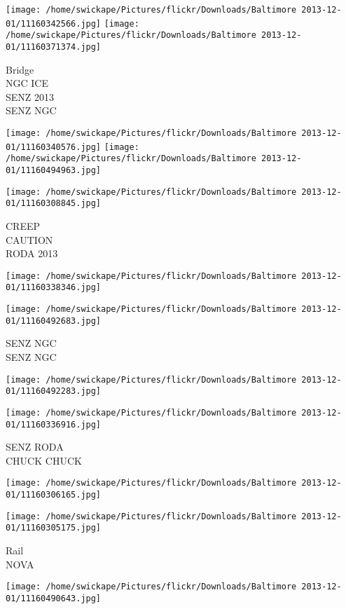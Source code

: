 \documentclass[10pt,letterpaper]{article}
\begin{document}
\texttt{[image: /home/swickape/Pictures/flickr/Downloads/Baltimore 2013-12-01/11160342566.jpg]}
\texttt{[image: /home/swickape/Pictures/flickr/Downloads/Baltimore 2013-12-01/11160371374.jpg]}

Bridge\\
NGC ICE\\
SENZ 2013\\
SENZ NGC
\pagebreak

\texttt{[image: /home/swickape/Pictures/flickr/Downloads/Baltimore 2013-12-01/11160340576.jpg]}
\texttt{[image: /home/swickape/Pictures/flickr/Downloads/Baltimore 2013-12-01/11160494963.jpg]}

\texttt{[image: /home/swickape/Pictures/flickr/Downloads/Baltimore 2013-12-01/11160308845.jpg]}

CREEP\\
CAUTION\\
RODA 2013
\pagebreak

\texttt{[image: /home/swickape/Pictures/flickr/Downloads/Baltimore 2013-12-01/11160338346.jpg]}

\vspace{0.25in}
\texttt{[image: /home/swickape/Pictures/flickr/Downloads/Baltimore 2013-12-01/11160492683.jpg]}

SENZ NGC\\
SENZ NGC
\pagebreak

\texttt{[image: /home/swickape/Pictures/flickr/Downloads/Baltimore 2013-12-01/11160492283.jpg]}

\vspace{0.25in}
\texttt{[image: /home/swickape/Pictures/flickr/Downloads/Baltimore 2013-12-01/11160336916.jpg]}

SENZ RODA\\
CHUCK CHUCK
\pagebreak

\texttt{[image: /home/swickape/Pictures/flickr/Downloads/Baltimore 2013-12-01/11160306165.jpg]}

\vspace{0.25in}
\texttt{[image: /home/swickape/Pictures/flickr/Downloads/Baltimore 2013-12-01/11160305175.jpg]}

Rail\\
NOVA
\pagebreak

\texttt{[image: /home/swickape/Pictures/flickr/Downloads/Baltimore 2013-12-01/11160490643.jpg]}
\end{document}
